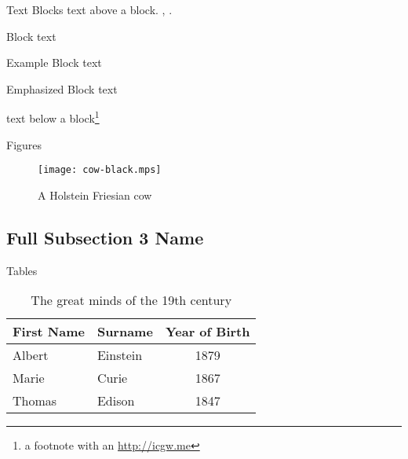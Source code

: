 \documentclass[]{beamer}
\begin{document}
\begin{frame}{Text Blocks}
	text above a block. , .
	\begin{block}{Block}
		text
	\end{block}
	\begin{exampleblock}{Example Block}
		text
	\end{exampleblock}
	\begin{alertblock}{Emphasized Block}
		text
	\end{alertblock}
	text below a block\footnote{a footnote with an \url{http://icgw.me}}
\end{frame}

\begin{frame}{Figures}
	\begin{figure}
		\texttt{[image: cow-black.mps]}
		\caption{A Holstein Friesian cow}
	\end{figure}
\end{frame}

\subsection[Short Subsection 3 Name]{Full Subsection 3 Name}

\begin{frame}{Tables}
	\begin{table}
		\begin{tabular}{llc}
			First Name & Surname  & Year of Birth \\ \midrule
			Albert     & Einstein & 1879          \\
			Marie      & Curie    & 1867          \\
			Thomas     & Edison   & 1847          \\
		\end{tabular}
		\caption{The great minds of the 19th century}
	\end{table}
\end{frame}
\end{document}
